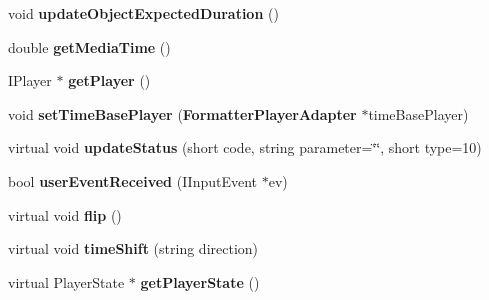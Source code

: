 \begin{CompactItemize}
\item 
void \textbf{updateObjectExpectedDuration} ()\label{classbr_1_1pucrio_1_1telemidia_1_1ginga_1_1ncl_1_1adapters_1_1FormatterPlayerAdapter_a3d3cc10a8525b948a3ffdcbd5a80321}

\item 
double \textbf{getMediaTime} ()\label{classbr_1_1pucrio_1_1telemidia_1_1ginga_1_1ncl_1_1adapters_1_1FormatterPlayerAdapter_7824aad20f39c7c1878549d56addc656}

\item 
IPlayer $\ast$ \textbf{getPlayer} ()\label{classbr_1_1pucrio_1_1telemidia_1_1ginga_1_1ncl_1_1adapters_1_1FormatterPlayerAdapter_6d3afe14429cee5cd595afe73ede06b3}

\item 
void \textbf{setTimeBasePlayer} ({\bf FormatterPlayerAdapter} $\ast$timeBasePlayer)\label{classbr_1_1pucrio_1_1telemidia_1_1ginga_1_1ncl_1_1adapters_1_1FormatterPlayerAdapter_2b1460cba619bd6ef6191241df0137a5}

\item 
virtual void \textbf{updateStatus} (short code, string parameter=\char`\"{}\char`\"{}, short type=10)\label{classbr_1_1pucrio_1_1telemidia_1_1ginga_1_1ncl_1_1adapters_1_1FormatterPlayerAdapter_c03f218bb250bf9c4176bd75a5fee484}

\item 
bool \textbf{userEventReceived} (IInputEvent $\ast$ev)\label{classbr_1_1pucrio_1_1telemidia_1_1ginga_1_1ncl_1_1adapters_1_1FormatterPlayerAdapter_1520ea57105d2db3e7f818b4d60667af}

\item 
virtual void {\bf flip} ()\label{classbr_1_1pucrio_1_1telemidia_1_1ginga_1_1ncl_1_1adapters_1_1FormatterPlayerAdapter_c72f57586f07b19e412cc260d54c715b}

\item 
virtual void \textbf{timeShift} (string direction)\label{classbr_1_1pucrio_1_1telemidia_1_1ginga_1_1ncl_1_1adapters_1_1FormatterPlayerAdapter_a423b9ab9d3f8c902dcf0dfb9559b674}

\item 
virtual PlayerState $\ast$ \textbf{getPlayerState} ()\label{classbr_1_1pucrio_1_1telemidia_1_1ginga_1_1ncl_1_1adapters_1_1FormatterPlayerAdapter_885c3c6e7e3ca0486ea8f67de68e2aa9}

\end{CompactItemize}
